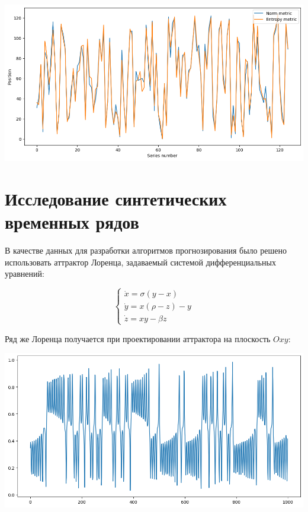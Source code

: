 \documentclass[a4paper, 12pt]{extarticle}
\begin{document}
\begin{center}
    \includegraphics[width=\textwidth]{img/metrics.png}
\end{center}

\newpage
\section{Исследование синтетических временных рядов}

В качестве данных для разработки алгоритмов прогнозирования было решено использовать аттрактор Лоренца, задаваемый системой дифференциальных уравнений:

$$
\begin{cases}
    \dot{x}=\sigma(y-x)\\
    \dot{y}=x(\rho-z)-y\\
    \dot{z}=xy-\beta z
\end{cases}
$$

Ряд же Лоренца получается при проектировании аттрактора на плоскость $Oxy$:

\begin{center}
    \includegraphics[width=\textwidth]{img/lorenz.png}
\end{center}
\end{document}
